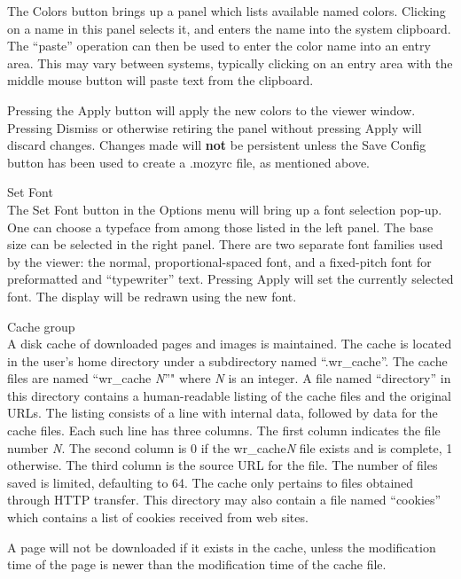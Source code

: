 \begin{description}
The {\cb Colors} button brings up a panel which lists available named
colors.  Clicking on a name in this panel selects it, and enters the
name into the system clipboard.  The ``paste'' operation can then be
used to enter the color name into an entry area.  This may vary
between systems, typically clicking on an entry area with the middle
mouse button will paste text from the clipboard.

Pressing the {\cb Apply} button will apply the new colors to the
viewer window.  Pressing {\cb Dismiss} or otherwise retiring the panel
without pressing {\cb Apply} will discard changes.  Changes made will
{\bf not} be persistent unless the {\cb Save Config} button has been
used to create a {\vt .mozyrc} file, as mentioned above.

\item{\cb Set Font}\\
The {\cb Set Font} button in the {\cb Options} menu will bring up a
font selection pop-up.  One can choose a typeface from among those
listed in the left panel.  The base size can be selected in the right
panel.  There are two separate font families used by the viewer:  the
normal, proportional-spaced font, and a fixed-pitch font for
preformatted and ``typewriter'' text.  Pressing {\cb Apply} will set
the currently selected font.  The display will be redrawn using the
new font.

\item{{\cb Cache} group}\\
A disk cache of downloaded pages and images is maintained.  The cache
is located in the user's home directory under a subdirectory named
``{\vt .wr\_cache}''.  The cache files are named ``{\vt wr\_cache}{\it
N}''" where {\it N} is an integer.  A file named ``{\vt directory}''
in this directory contains a human-readable listing of the cache files
and the original URLs.  The listing consists of a line with internal
data, followed by data for the cache files.  Each such line has three
columns.  The first column indicates the file number {\it N}.  The
second column is 0 if the {\vt wr\_cache}{\it N} file exists and is
complete, 1 otherwise.  The third column is the source URL for the
file.  The number of files saved is limited, defaulting to 64.  The
cache only pertains to files obtained through HTTP transfer.  This
directory may also contain a file named ``{\vt cookies}'' which
contains a list of cookies received from web sites.

A page will not be downloaded if it exists in the cache, unless the
modification time of the page is newer than the modification time of
the cache file.


\end{description}
